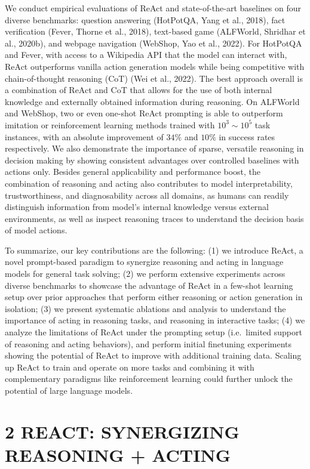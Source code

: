 \documentclass[
]{article}
\begin{document}
We conduct empirical evaluations of ReAct and state-of-the-art baselines
on four diverse benchmarks: question answering (HotPotQA, Yang et al.,
2018), fact verification (Fever, Thorne et al., 2018), text-based game
(ALFWorld, Shridhar et al., 2020b), and webpage navigation (WebShop, Yao
et al., 2022). For HotPotQA and Fever, with access to a Wikipedia API
that the model can interact with, ReAct outperforms vanilla action
generation models while being competitive with chain-of-thought
reasoning (CoT) (Wei et al., 2022). The best approach overall is a
combination of ReAct and CoT that allows for the use of both internal
knowledge and externally obtained information during reasoning. On
ALFWorld and WebShop, two or even one-shot ReAct prompting is able to
outperform imitation or reinforcement learning methods trained with
\(10^{3} \sim 10^{5}\) task instances, with an absolute improvement of
\(34\%\) and \(10\%\) in success rates respectively. We also demonstrate
the importance of sparse, versatile reasoning in decision making by
showing consistent advantages over controlled baselines with actions
only. Besides general applicability and performance boost, the
combination of reasoning and acting also contributes to model
interpretability, trustworthiness, and diagnosability across all
domains, as humans can readily distinguish information from model's
internal knowledge versus external environments, as well as inspect
reasoning traces to understand the decision basis of model actions.

To summarize, our key contributions are the following: (1) we introduce
ReAct, a novel prompt-based paradigm to synergize reasoning and acting
in language models for general task solving; (2) we perform extensive
experiments across diverse benchmarks to showcase the advantage of ReAct
in a few-shot learning setup over prior approaches that perform either
reasoning or action generation in isolation; (3) we present systematic
ablations and analysis to understand the importance of acting in
reasoning tasks, and reasoning in interactive tasks; (4) we analyze the
limitations of ReAct under the prompting setup (i.e.~limited support of
reasoning and acting behaviors), and perform initial finetuning
experiments showing the potential of ReAct to improve with additional
training data. Scaling up ReAct to train and operate on more tasks and
combining it with complementary paradigms like reinforcement learning
could further unlock the potential of large language models.

\section{2 REACT: SYNERGIZING REASONING +
ACTING}\label{react-synergizing-reasoning-acting}
\end{document}
